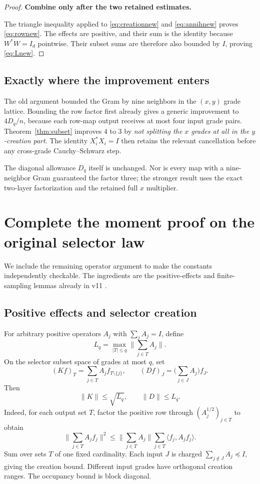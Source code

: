 \documentclass[11pt]{article}
\numberwithin{equation}{section}
\theoremstyle{definition}\newtheorem{definition}[theorem]{Definition}
\theoremstyle{remark}\newtheorem{remark}[theorem]{Remark}
\newcommand{\norm}[1]{\lVert#1\rVert}\newcommand{\ip}[2]{\langle#1,#2\rangle}
\newcommand{\step}[1]{\par\addvspace{.65\baselineskip}\Needspace{4\baselineskip}\noindent\textbf{#1}\par\nobreak\smallskip}
\begin{document}
\begin{proof}
\step{Combine only after the two retained estimates.}
The triangle inequality applied to \eqref{eq:creationnew} and \eqref{eq:annihnew} proves \eqref{eq:rownew}. The effects are positive, and their sum is the identity because $W^*W=I_d$ pointwise. Their subset sums are therefore also bounded by $I$, proving \eqref{eq:Lnew}.
\end{proof}

\subsection{Exactly where the improvement enters}
The old argument bounded the Gram by nine neighbors in the $(x,y)$ grade lattice. Bounding the row factor first already gives a generic improvement to $4D_q/n$, because each row-map output receives at most four input grade pairs. Theorem~\ref{thm:subset} improves $4$ to $3$ by \emph{not splitting the $x$ grades at all in the $y$-creation part}. The identity $X_i^*X_i=I$ then retains the relevant cancellation before any cross-grade Cauchy--Schwarz step.

The diagonal allowance $D_q$ itself is unchanged. Nor is every map with a nine-neighbor Gram guaranteed the factor three; the stronger result uses the exact two-layer factorization and the retained full $x$ multiplier.

\section{Complete the moment proof on the original selector law}
\label{sec:moments}
We include the remaining operator argument to make the constants independently checkable. The ingredients are the positive-effects and finite-sampling lemmas already in v11 \cite{Framework}.

\subsection{Positive effects and selector creation}
For arbitrary positive operators $A_j$ with $\sum_jA_j=I$, define
\[
 L_q=\max_{|T|\le q}\norm{\sum_{j\in T}A_j}.
\]
On the selector subset space of grades at most $q$, set
\[
 (Kf)_T=\sum_{j\in T}A_jf_{T\setminus\{j\}},\qquad
 (Df)_J=\Big(\sum_{j\in J}A_j\Big)f_J.
\]
Then
\begin{equation}
 \norm K\le\sqrt{L_q},\qquad \norm D\le L_q.
 \label{eq:positive}
\end{equation}
Indeed, for each output set $T$, factor the positive row through $(A_j^{1/2})_{j\in T}$ to obtain
\[
 \norm{\sum_{j\in T}A_jf_j}^2
 \le\norm{\sum_{j\in T}A_j}\sum_{j\in T}\ip{f_j}{A_jf_j}.
\]
Sum over sets $T$ of one fixed cardinality. Each input $J$ is charged $\sum_{j\notin J}A_j\preceq I$, giving the creation bound. Different input grades have orthogonal creation ranges. The occupancy bound is block diagonal.
\end{document}
